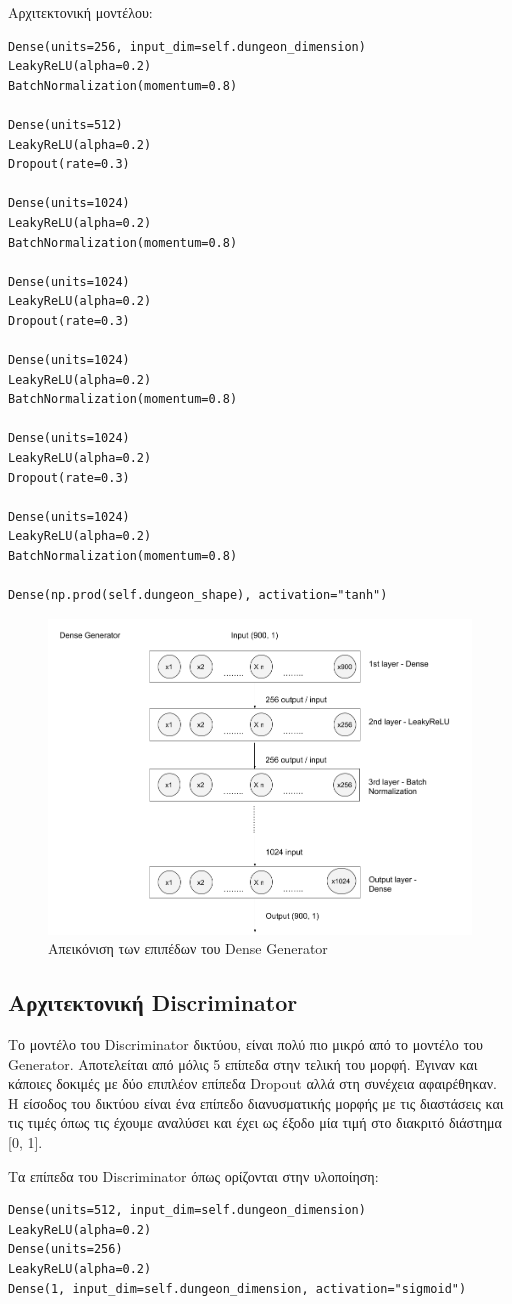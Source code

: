 \par
Αρχιτεκτονική μοντέλου:
\begin{verbatim}
Dense(units=256, input_dim=self.dungeon_dimension)
LeakyReLU(alpha=0.2)
BatchNormalization(momentum=0.8)

Dense(units=512)
LeakyReLU(alpha=0.2)
Dropout(rate=0.3)

Dense(units=1024)
LeakyReLU(alpha=0.2)
BatchNormalization(momentum=0.8)

Dense(units=1024)
LeakyReLU(alpha=0.2)
Dropout(rate=0.3)

Dense(units=1024)
LeakyReLU(alpha=0.2)
BatchNormalization(momentum=0.8)

Dense(units=1024)
LeakyReLU(alpha=0.2)
Dropout(rate=0.3)

Dense(units=1024)
LeakyReLU(alpha=0.2)
BatchNormalization(momentum=0.8)

Dense(np.prod(self.dungeon_shape), activation="tanh")
\end{verbatim}

\begin{figure}[H]
\centering
\includegraphics[width=.8\linewidth]{../images/graphs/Dense_generator.png}
\caption{Απεικόνιση των επιπέδων του Dense Generator}
\label{fig:fig}
\end{figure}


\subsection{Αρχιτεκτονική Discriminator}
Το μοντέλο του Discriminator δικτύου, είναι πολύ πιο μικρό από το μοντέλο του Generator. Αποτελείται από μόλις 5 επίπεδα στην τελική του μορφή. Έγιναν και κάποιες δοκιμές με δύο επιπλέον επίπεδα Dropout αλλά στη συνέχεια αφαιρέθηκαν. Η είσοδος του δικτύου είναι ένα επίπεδο διανυσματικής μορφής με τις διαστάσεις και τις τιμές όπως τις έχουμε αναλύσει και έχει ως έξοδο μία τιμή στο διακριτό διάστημα [0, 1].
\par
Τα επίπεδα του Discriminator όπως ορίζονται στην υλοποίηση:
\begin{verbatim}
Dense(units=512, input_dim=self.dungeon_dimension)
LeakyReLU(alpha=0.2)
Dense(units=256)
LeakyReLU(alpha=0.2)
Dense(1, input_dim=self.dungeon_dimension, activation="sigmoid")
\end{verbatim}

